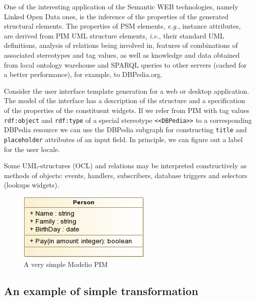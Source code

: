 \documentclass[runningheads]{llncs}
\begin{document}
One of the interesting application of the Semantic WEB technologies, namely Linked Open Data ones, is the inference of the properties of the generated structural elements.  The properties of PSM elements, \emph{e.g.}, instance attributes, are derived from PIM UML structure elements, \emph{i.e.}, their standard UML definitions, analysis of relations being involved in, features of combinations of associated stereotypes and tag values, as well as knowledge and data obtained from local ontology warehouse and SPARQL queries to other servers (cached for a better performance), for example, to DBPedia.org.

Consider the user interface template generation for a web or desktop application.  The model of the interface has a description of the structure and a specification of the properties of the constituent widgets.  If we refer from PIM with tag values \texttt{rdf:object} and \texttt{rdf:type} of a special stereotype \texttt{<<DBPedia>>} to a corresponding DBPedia resource we can use the DBPedia subgraph for constructing \texttt{title} and \texttt{placeholder} attributes of an input field.  In principle, we can figure out a label for the user locale.


Some UML-structures (OCL) and relations may be interpreted constructively as methods of objects: events, handlers, subscribers, database triggers and selectors (lookups widgets).

\begin{figure}[t]
  \centering
  \includegraphics[width=0.6\linewidth]{pics/samples-Class-diagram.png}
  \caption{A very simple Modelio PIM}
  \label{fig:pim}
\end{figure}

\subsection{An example of simple transformation}
\label{sec:simpletr}
\end{document}
